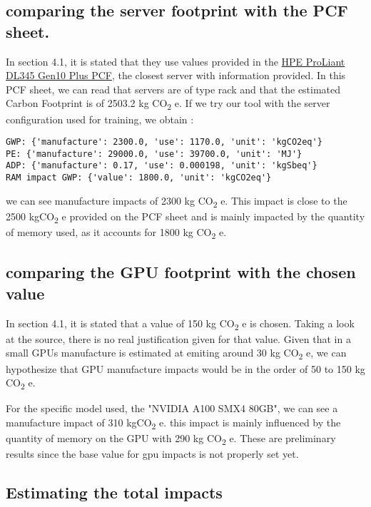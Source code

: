 \documentclass[11pt]{article}
\begin{document}
\subsection{comparing the server footprint with the PCF sheet.}
\label{sec:org06426ec}

In section 4.1, it is stated that they use values provided in the
\href{https://www.hpe.com/psnow/doc/a50005151enw}{HPE ProLiant DL345 Gen10 Plus PCF}, the closest server with
information provided. In this PCF sheet, we can read that servers
are of type rack and that the estimated Carbon Footprint is of
2503.2 kg CO\textsubscript{2} e.
If we try our tool with the server configuration used for training,
we obtain :

\begin{verbatim}
GWP: {'manufacture': 2300.0, 'use': 1170.0, 'unit': 'kgCO2eq'}
PE: {'manufacture': 29000.0, 'use': 39700.0, 'unit': 'MJ'}
ADP: {'manufacture': 0.17, 'use': 0.000198, 'unit': 'kgSbeq'}
RAM impact GWP: {'value': 1800.0, 'unit': 'kgCO2eq'}
\end{verbatim}


we can see manufacture impacts of 2300 kg CO\textsubscript{2} e. This impact is close
to the 2500 kgCO\textsubscript{2} e provided on the PCF sheet and is mainly impacted
by the quantity of memory used, as it accounts for 1800 kg CO\textsubscript{2} e.

\subsection{comparing the GPU footprint with the chosen value}
\label{sec:org4ccf97d}

In section 4.1, it is stated that a value of 150 kg CO\textsubscript{2} e is
chosen. Taking a look at the source, there is no real justification
given for that value. Given that in \cite{Loubet2023life} a small GPUs
manufacture is estimated at emiting around 30 kg CO\textsubscript{2} e, we can
hypothesize that GPU manufacture impacts would be in the order of 50
to 150 kg CO\textsubscript{2} e.

For the specific model used, the "NVIDIA A100 SMX4 80GB", we can see
a manufacture impact of 310 kgCO\textsubscript{2} e. this impact is mainly influenced
by the quantity of memory on the GPU with 290 kg CO\textsubscript{2} e.
These are preliminary results since the base value for gpu impacts is
not properly set yet.

\subsection{Estimating the total impacts}
\label{sec:orgf46f74c}
\end{document}
